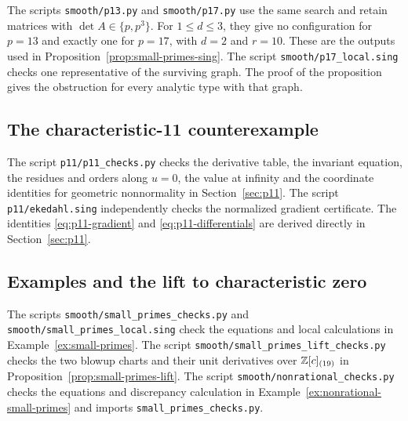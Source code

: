 The scripts \texttt{smooth/p13.py} and \texttt{smooth/p17.py} use the same search and retain matrices with $\det A\in\{p,p^3\}$.
For $1\leq d\leq 3$, they give no configuration for $p = 13$ and exactly one for $p = 17$, with $d = 2$ and $r = 10$.
These are the outputs used in Proposition~\ref{prop:small-primes-sing}.
The script \texttt{smooth/p17\_local.sing} checks one representative of the surviving graph.
The proof of the proposition gives the obstruction for every analytic type with that graph.

\subsection{The characteristic-11 counterexample}\label{app:scripts-p11}

The script \texttt{p11/p11\_checks.py} checks the derivative table, the invariant equation, the residues and orders along $u = 0$, the value at infinity and the coordinate identities for geometric nonnormality in Section~\ref{sec:p11}.
The script \texttt{p11/ekedahl.sing} independently checks the normalized gradient certificate.
The identities \eqref{eq:p11-gradient} and \eqref{eq:p11-differentials} are derived directly in Section~\ref{sec:p11}.

\subsection{Examples and the lift to characteristic zero}\label{app:scripts-examples}

The scripts \texttt{smooth/small\_primes\_checks.py} and \texttt{smooth/small\_primes\_local.sing} check the equations and local calculations in Example~\ref{ex:small-primes}.
The script \texttt{smooth/small\_primes\_lift\_checks.py} checks the two blowup charts and their unit derivatives over $\mathbb{Z}[c]_{(19)}$ in Proposition~\ref{prop:small-primes-lift}.
The script \texttt{smooth/nonrational\_checks.py} checks the equations and discrepancy calculation in Example~\ref{ex:nonrational-small-primes} and imports \texttt{small\_primes\_checks.py}.
